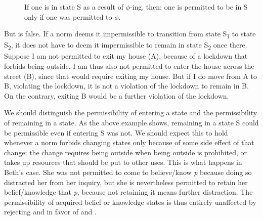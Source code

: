 \documentclass[12pt]{article}
\begin{document}
\begin{description}
    \item[\ppa] If one is in state S as a result of $\phi$-ing, then: one is permitted to be in S only if one was permitted to $\phi$.
\end{description}
%
But \ppa{} is false. If a norm deems it impermissible to transition from state S\textsubscript{1} to state S\textsubscript{2}, it does not have to deem it impermissible to remain in state S\textsubscript{2} once there. Suppose I am not permitted to exit my house (A), because of a lockdown that forbids being outside. I am thus also not permitted to enter the house across the street (B), since that would require exiting my house. But if I do move from A to B, violating the lockdown, it is not a violation of the lockdown to remain in B. On the contrary, exiting B would be a further violation of the lockdown.

We should distinguish the permissibility of entering a state and the permissibility of remaining in a state. As the above example shows, remaining in a state S could be permissible even if entering S was not. We should expect this to hold whenever a norm forbids changing states only because of some side effect of that change: the change requires being outside when being outside is prohibited, or takes up resources that should be put to other uses. This is what happens in Beth's case. She was not permitted to come to believe/know \textit{p} because doing so distracted her from her inquiry, but she is nevertheless permitted to retain her belief/knowledge that \textit{p}, because not retaining it means further distraction. The permissibility of acquired belief or knowledge states is thus entirely unaffected by rejecting \ep{} and \eo{} in favor of \epc{} and \eoc{}.

\printbibliography
\end{document}
